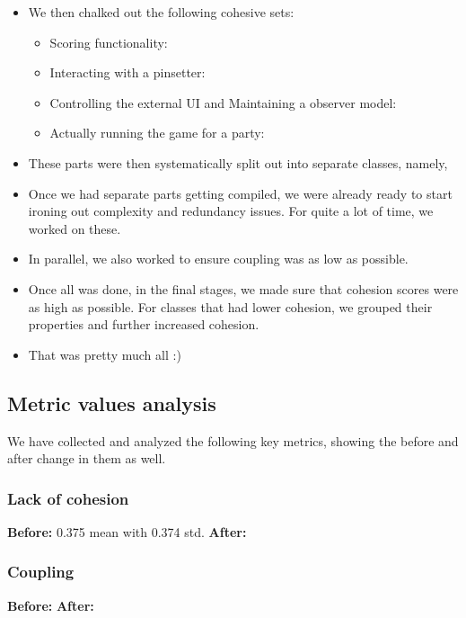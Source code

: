 \begin{itemize}
    \item We then chalked out the following cohesive sets:
          \begin{itemize}
              \item Scoring functionality: 
              \item Interacting with a pinsetter: 
              \item Controlling the external UI and Maintaining a observer model: 
              \item Actually running the game for a party: 
          \end{itemize}

    \item These parts were then systematically split out into separate classes, namely, 
    \item Once we had separate parts getting compiled, we were already ready to start ironing out complexity and redundancy issues. For quite a lot of time, we worked on these.
    \item In parallel, we also worked to ensure coupling was as low as possible.
    \item Once all was done, in the final stages, we made sure that cohesion scores were as high as possible. For classes that had lower cohesion, we grouped their properties and further increased cohesion.
    \item That was pretty much all :)
\end{itemize}

\subsection{Metric values analysis}

We have collected and analyzed the following key metrics, showing the before and after change in them as well.

\subsubsection{Lack of cohesion}

\textbf{Before:} 0.375 mean with 0.374 std.
\textbf{After:}

\subsubsection{Coupling}
\textbf{Before:}
\textbf{After:}


